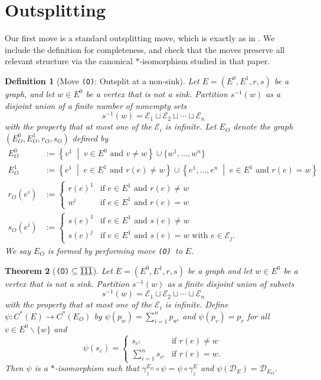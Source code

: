 \documentclass[12pt]{amsbook}%
\newcommand{\setof}[2]{\left\{ #1 \;\middle|\; #2 \right\}}
\newtheorem{theor}{Theorem}[section]
\theoremstyle{defin}
\newtheorem{defin}[theor]{Definition}
\theoremstyle{remark}
\numberwithin{equation}{chapter}
\numberwithin{theor}{section}
\newcommand{\xyzrel}[1]{\mbox{$\overline{\underline{\mathsf{ #1}}}$}}
\newcommand{\OOO}{\mbox{\texttt{\textup{(O)}}}}
\begin{document}
\section{Outsplitting}

Our first move is a standard outsplitting move, which is exactly as in \cite{tbdp:fega}. We include the definition for completeness, and check that the moves preserve all relevant structure via the canonical $*$-isomorphism studied in that paper.


\begin{defin}[Move \OOO: Outsplit at a non-sink]\label{OOO}\index{O@\OOO\ move}
Let $E = (E^0 , E^1 , r, s)$ be a graph, and let $w \in E^0$ be a vertex that is not a sink. 
Partition $s^{-1} (w)$ as a disjoint union of a finite number of nonempty sets
$$s^{-1}(w) = \mathcal{E}_1\sqcup \mathcal{E}_2\sqcup \cdots \sqcup\mathcal{E}_n$$
with the property that at most one of the $\mathcal{E}_i$ is infinite. 
Let $E_O$ denote the graph $(E_O^0, E_O^1, r_O , s_O )$ defined by 
\begin{align*}
E_O^0&:= \setof{v^1}{v \in E^0\text{ and }v \neq w}\cup\{w^1, \ldots, w^n\} \\
E_O^1&:= \setof{e^1}{e \in E^1\text{ and }r(e) \neq w}\cup \setof{e^1, \ldots , e^n}{e \in E^1\text{ and }r(e) = w} \\
r_{O} (e^i ) &:= 
\begin{cases}
r(e)^1 & \text{if }e \in E^1\text{ and }r(e) \neq w\\
w^i & \text{if }e \in E^1\text{ and }r(e) = w
\end{cases} \\
s_{O} (e^i ) &:= 
\begin{cases}
s(e)^1 & \text{if }e \in E^1\text{ and }s(e) \neq w \\
s(e)^j & \text{if }e \in E^1\text{ and }s(e) = w\text{ with }e \in \mathcal{E}_j.
\end{cases}
\end{align*}
We  say $E_O$ is formed by
performing move \OOO\ to $E$.
\end{defin}


\begin{theor}[$\OOO\subseteq \xyzrel{111}$]\label{thm:outsplitting}
Let $E = ( E^0, E^1, r , s )$ be a graph and let $w \in E^0$ be a vertex that is not a sink.  Partition $s^{-1} (w)$ as a finite disjoint union of  subsets
\[
s^{-1} (w) = \mathcal{E}_1 \sqcup \mathcal{E}_2 \sqcup \cdots \sqcup \mathcal{E}_n
\]
with the property that at most one of the $\mathcal{E}_i$ is infinite.  Define $\psi \colon C^*(E) \to C^*(E_{O})$ by $\psi ( p_w ) = \sum_{i=1}^np_{ w^i}$ and $\psi(p_v)=p_v$ for all $v \in E^0\backslash\{w\}$ and 
\[
\psi ( s_{e} ) =
\begin{cases}
s_{e^1} &\text{if $r (e) \neq w$} \\
\sum_{i=1}^ns_{e^i} &\text{if $r (e) = w$.}
\end{cases}
\]
 Then $\psi$ is a $*$-isomorphism such that $\gamma_z^{E_{O}} \circ \psi = \psi \circ \gamma_z^E$ and $\psi ( \mathcal{D}_E ) =  \mathcal{D}_{E_{O}}$.
\end{theor}
\end{document}
